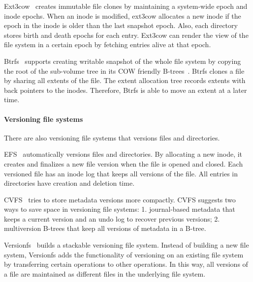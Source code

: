 Ext3cow~\cite{ext3cow} creates immutable file clones by maintaining a
system-wide epoch and inode epochs.
When an inode is modified, ext3cow allocates a new inode if the epoch in the
inode is older than the last snapshot epoch.
Also, each directory stores birth and death epochs for each entry.
Ext3cow can render the view of the file system in a certain epoch by fetching
entries alive at that epoch.

Btrfs~\cite{btrfs} supports creating writable snapshot of the whole file system
by copying the root of the sub-volume tree in its COW friendly
B-trees~\cite{cowbtree}.
Btrfs clones a file by sharing all extents of the file.
The extent allocation tree records extents with back pointers to the inodes.
Therefore, Btrfs is able to move an extent at a later time.

\paragraph{Versioning file systems}

There are also versioning file systems that versions files and directories.

EFS~\cite{efs} automatically versions files and directories.
By allocating a new inode, it creates and finalizes a new file version when the
file is opened and closed.
Each versioned file has an inode log that keeps all versions of the file.
All entries in directories have creation and deletion time.

CVFS~\cite{cvfs} tries to store metadata versions more compactly.
CVFS suggests two ways to save space in versioning file systems:
1. journal-based metadata that keeps a current version and an undo log to
recover previous versions;
2. multiversion B-trees that keep all versions of metadata in a B-tree.

Versionfs~\cite{versionfs} builds a stackable versioning file system.
Instead of building a new file system, Versionfs adds the functionality of
versioning on an existing file system by transferring certain operations to
other operations.
In this way, all versions of a file are maintained as different files in the
underlying file system.
